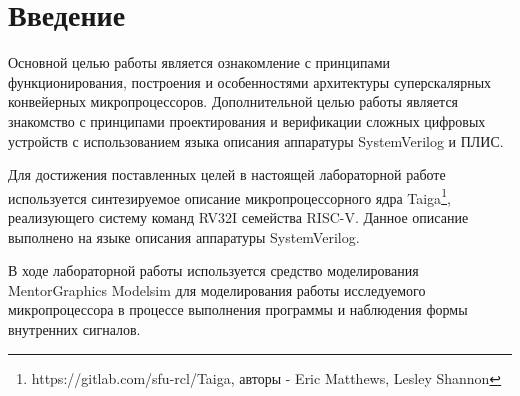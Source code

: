 \chapter*{Введение}

Основной целью работы является ознакомление с принципами функционирования, построения и особенностями архитектуры суперскалярных конвейерных микропроцессоров. Дополнительной целью работы является знакомство с принципами проектирования и верификации сложных цифровых устройств с использованием языка описания аппаратуры SystemVerilog и ПЛИС.

Для достижения поставленных целей в настоящей лабораторной работе используется синтезируемое описание микропроцессорного ядра Taiga\footnote{https://gitlab.com/sfu-rcl/Taiga, авторы - Eric Matthews,  Lesley Shannon}, реализующего систему команд RV32I семейства RISC-V. Данное описание выполнено на языке описания аппаратуры SystemVerilog.

В ходе лабораторной работы используется средство моделирования MentorGraphics Modelsim для моделирования работы исследуемого микропроцессора в процессе выполнения программы и наблюдения формы внутренних сигналов.